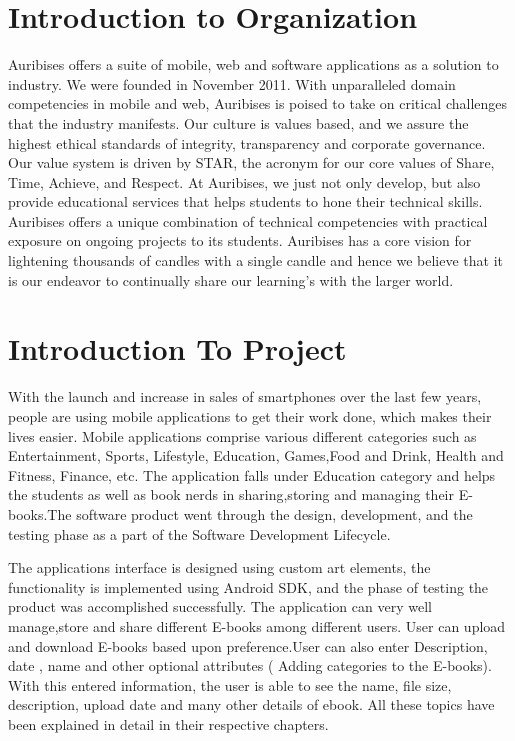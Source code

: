 \section{Introduction to Organization}
Auribises offers a suite of mobile, web and software applications as a solution to industry. 
We were founded in November 2011. With unparalleled domain competencies in mobile and web, Auribises is poised to take on critical challenges that the industry manifests. Our culture is values based, and we assure the highest ethical standards of integrity, transparency and corporate governance. Our value system is driven by STAR, the acronym for our core values of Share, Time, Achieve, and Respect. At Auribises, we just not only develop, but also provide educational services that helps students to hone their technical skills. Auribises offers a unique combination of technical competencies with practical exposure on ongoing projects to its students. Auribises has a core vision for lightening thousands of candles with a single candle and hence we believe that it is our endeavor to continually share our learning’s with the larger world.
\section{Introduction To Project} 
With the launch and increase in sales of smartphones over the last few years, people are using
mobile applications to get their work done, which makes their lives easier. Mobile applications
comprise various different categories such as Entertainment, Sports, Lifestyle, Education, Games,Food and Drink, Health and Fitness, Finance, etc. The application falls under Education category and helps the students as well as book nerds in sharing,storing and managing
their E-books.The software product went through the design, development, and the testing
phase as a part of the Software Development Lifecycle.

The applications interface is designed using custom art elements, the functionality is implemented using Android SDK, and the phase of testing the product was accomplished successfully. The application can very well manage,store and share different E-books among different users. User can upload and download E-books based upon preference.User can also enter
Description, date , name  and other optional attributes ( Adding categories  to the E-books). With this entered information, the user is able to see the name, file size, description, upload date and many other details of ebook. All these topics have been explained in detail in their respective chapters.

